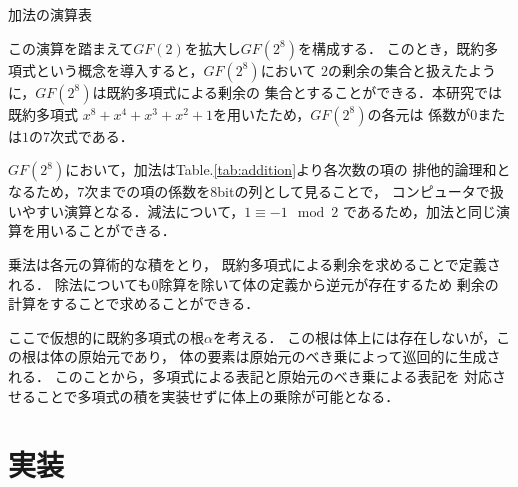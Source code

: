 \documentclass[twocolumn, fleqn, uplatex]{jsarticle}
\begin{document}
\begin{table}[htbp]
	\begin{minipage}[t]{0.45\hsize}
		\caption{加法の演算表}
		\centering
		\label{tab:addition}
	\end{minipage}
	\hfill
	\begin{minipage}[t]{0.45\hsize}
		\caption{乗法の演算表}
		\centering
		\label{tab:multiplication}
	\end{minipage}
\end{table}

この演算を踏まえて$GF(2)$を拡大し$GF(2^8)$を構成する．%
このとき，既約多項式という概念を導入すると，$GF(2^8)$において%
$2$の剰余の集合と扱えたように，$GF(2^8)$は既約多項式による剰余の%
集合とすることができる．本研究では既約多項式%
$x^{8}+x^{4}+x^{3}+x^{2}+1$を用いたため，$GF(2^8)$の各元は%
係数が$0$または$1$の$7$次式である．

$GF(2^8)$において，加法はTable.\ref{tab:addition}より各次数の項の%
排他的論理和となるため，$7$次までの項の係数を8bitの列として見ることで，%
コンピュータで扱いやすい演算となる．減法について，$1{\equiv}−1\mod2$%
であるため，加法と同じ演算を用いることができる．

乗法は各元の算術的な積をとり，%
既約多項式による剰余を求めることで定義される．%
除法についても$0$除算を除いて体の定義から逆元が存在するため%
剰余の計算をすることで求めることができる．

ここで仮想的に既約多項式の根$\alpha$を考える．%
この根は体上には存在しないが，この根は体の原始元であり，%
体の要素は原始元のべき乗によって巡回的に生成される．%
このことから，多項式による表記と原始元のべき乗による表記を%
対応させることで多項式の積を実装せずに体上の乗除が可能となる\cite{lit:nozaki-2}．

\section{実装}
\end{document}
